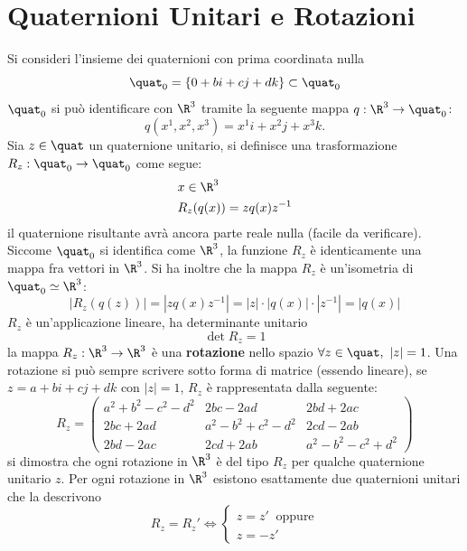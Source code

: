 \documentclass[10pt, letterpaper]{report}
\begin{document}
\section{Quaternioni Unitari e Rotazioni}
Si consideri l'insieme dei quaternioni con prima coordinata nulla
\begin{equation}
    \quat_0=\{0+bi+cj+dk\}\subset\quat_0
\end{equation}
$\quat_0$ si può identificare con $\R^3$ tramite la seguente mappa $q:\R^3\rightarrow\quat_0$:\begin{equation}
    q(x^1,x^2,x^3)=x^1i+x^2j+x^3k.
\end{equation} 
Sia $z\in\quat$ un quaternione unitario, si definisce una trasformazione $R_z:\quat_0\rightarrow\quat_0$ come segue:\begin{align}
   & x\in\R^3\\
   & R_z(q(x))=zq(x)z^{-1}
\end{align}
il quaternione risultante avrà ancora parte reale nulla (facile da verificare). Siccome $\quat_0$ si identifica come $\R^3$, la funzione $R_z$ è identicamente una mappa fra vettori in $\R^3$. Si ha inoltre che la mappa $R_z$ è un'isometria di $\quat_0\simeq\R^3$:\begin{equation}
    |R_z(q(z))|=|zq(x)z^{-1}|=|z|\cdot|q(x)|\cdot|z^{-1}|=|q(x)|
\end{equation}
$R_z$ è un'applicazione lineare, ha determinante unitario\begin{equation}
    \det R_z=1
\end{equation}
la mappa $R_z:\R^3\rightarrow\R^3$ è una \textbf{rotazione} nello spazio $\forall z\in\quat, \ |z|=1$. Una rotazione si può sempre scrivere sotto forma di matrice (essendo lineare), se $z= a+bi+cj+dk$ con $|z|=1$, $R_z$ è rappresentata dalla seguente:\begin{equation}
    R_z = \begin{pmatrix}
a^2+b^2-c^2-d^2 & 2bc-2ad & 2bd+2ac \\
2bc+2ad & a^2-b^2+c^2-d^2 & 2cd-2ab \\
2bd-2ac & 2cd+2ab & a^2-b^2-c^2+d^2
\end{pmatrix}
\end{equation}
si dimostra che ogni rotazione in $\R^3$ è del tipo $R_z$ per qualche quaternione unitario $z$. Per ogni rotazione in $\R^3$ esistono esattamente due quaternioni unitari che la descrivono\begin{equation}
    R_z=R_z'\iff\begin{cases}
        z=z'\ \text{ oppure}\\z=-z'
    \end{cases}
\end{equation}
\end{document}
